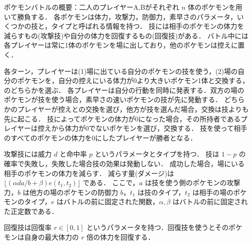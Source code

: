 \documentclass{jsarticle}
\theoremstyle{definition}
\begin{document}
ポケモンバトルの概要：二人のプレイヤーA,Bがそれぞれ $n$ 体のポケモンを用いて勝負する．
各ポケモンは体力，攻撃力，防御力，素早さのパラメータ，いくつかの技と，タイプと呼ばれる情報を持つ．
技には相手のポケモンの体力を減らすもの(攻撃技)や自分の体力を回復するもの(回復技)がある．
バトル中には各プレイヤーは常に1体のポケモンを場に出しており，他のポケモンは控えに置く．

各ターン，プレイヤーは(1)場に出ている自分のポケモンの技を使う，(2)場の自分のポケモンを，自分の控えにいる体力が0より大きいポケモン1体と交換する，のどちらかを選ぶ．
各プレイヤーは自分の行動を同時に発表する．双方の場のポケモンが技を使う場合，素早さの速いポケモンの技が先に発動する．
どちらかのプレイヤーが控えとの交換を選び，他方が技を選んだ場合，交換は技よりも先に起こる．
技によってポケモンの体力が0になった場合，その所持者であるプレイヤーは控えから体力が0でないポケモンを選び，交換する．
技を使って相手のすべてのポケモンの体力を0にしたプレイヤーが勝者となる．

攻撃技には威力 $d$ と命中率 $p$ というパラメータとタイプを持つ．
技は $1-p$ の確率で失敗し，失敗した場合技の効果は発動しない．
成功した場合，場にいる相手のポケモンの体力を減らす．
減らす量(ダメージ)は $\lfloor(\alpha da/b + \beta)e(t_1,t_2)\rfloor$ である．
ここで，$a$ は技を使う側のポケモンの攻撃力，$b$ は他方の場のポケモンの防御力 $b$，$t_1$ は技のタイプ，$t_2$ は相手の場のポケモンのタイプ，$e$ はバトルの前に固定された関数，$\alpha,\beta$ はバトルの前に固定された正定数である．

回復技は回復率 $r\in[0,1]$ というパラメータを持つ．回復技を使うとそのポケモンは自身の最大体力の $r$ 倍の体力を回復する．
\end{document}
